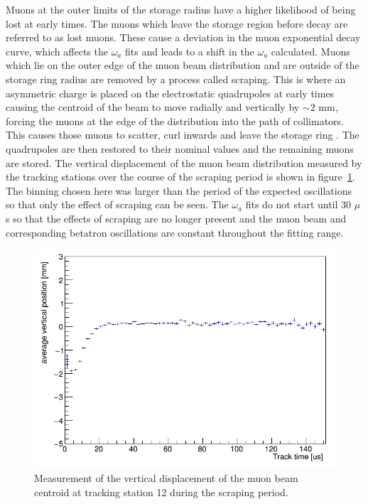 Muons at the outer limits of the storage radius have a higher likelihood of being lost at early times. The muons which leave the storage region before decay are referred to as lost muons. These cause a deviation in the muon exponential decay curve, which affects the $\omega_{a}$ fits and leads to a shift in the $\omega_{a}$ calculated. Muons which lie on the outer edge of the muon beam distribution and are outside of the storage ring radius are removed by a process called scraping. This is where an asymmetric charge is placed on the electrostatic quadrupoles at early times causing the centroid of the beam to move radially and vertically by $\sim{2}$ mm, forcing the muons at the edge of the distribution into the path of collimators. This causes those muons to scatter, curl inwards and leave the storage ring \cite{muonloss1}. The quadrupoles are then restored to their nominal values and the remaining muons are stored. The vertical displacement of the muon beam distribution measured by the tracking stations over the course of the scraping period is shown in figure~\ref{fig:AverageVerticalPosition_station12}. The binning chosen here was larger than the period of the expected oscillations so that only the effect of scraping can be seen. The $\omega_{a}$ fits do not start until 30 $\mu$s so that the effects of scraping are no longer present and the muon beam and corresponding betatron oscillations are constant throughout the fitting range.

\begin{figure}[ht]
\centering 
\includegraphics[scale=0.5]{Figures/AverageVerticalPosition_station12.png}
\decoRule
\caption{Measurement of the vertical displacement of the muon beam centroid at tracking station 12 during the scraping period.}
\label{fig:AverageVerticalPosition_station12}
\end{figure}

